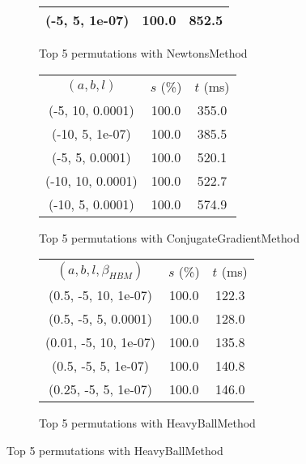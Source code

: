 \begin{figure}[H]
\begin{subfigure}[ht]{.5\textwidth}
\begin{tabular}{|c|c|c|}
(-5, 5, 1e-07) & 100.0 & 852.5 \\
\hline
\end{tabular}
\caption{Top 5 permutations with NewtonsMethod}
\label{subfig:param_comp_GoldenSectionSearch_NewtonsMethod}
\end{subfigure}
\hfill
\begin{subfigure}[ht]{.5\textwidth}
\begin{tabular}{|c|c|c|}
\hline
\rowcolor{gray!25}
\multicolumn{3}{|c|}{ConjugateGradientMethod} \\
\hline
\rowcolor{gray!25}
$(a,b,l)$ & $s$ (\%) & $t$ (ms) \\
\hline
(-5, 10, 0.0001) & 100.0 & 355.0 \\
(-10, 5, 1e-07) & 100.0 & 385.5 \\
(-5, 5, 0.0001) & 100.0 & 520.1 \\
(-10, 10, 0.0001) & 100.0 & 522.7 \\
(-10, 5, 0.0001) & 100.0 & 574.9 \\
\hline
\end{tabular}
\caption{Top 5 permutations with ConjugateGradientMethod}
\label{subfig:param_comp_GoldenSectionSearch_ConjugateGradientMethod}
\end{subfigure}
\hfill
\begin{subfigure}[ht]{.5\textwidth}
\begin{tabular}{|c|c|c|}
\hline
\rowcolor{gray!25}
\multicolumn{3}{|c|}{HeavyBallMethod} \\
\hline
\rowcolor{gray!25}
$(a,b,l,\beta_{HBM})$ & $s$ (\%) & $t$ (ms) \\
\hline
(0.5, -5, 10, 1e-07) & 100.0 & 122.3 \\
(0.5, -5, 5, 0.0001) & 100.0 & 128.0 \\
(0.01, -5, 10, 1e-07) & 100.0 & 135.8 \\
(0.5, -5, 5, 1e-07) & 100.0 & 140.8 \\
(0.25, -5, 5, 1e-07) & 100.0 & 146.0 \\
\hline
\end{tabular}
\caption{Top 5 permutations with HeavyBallMethod}
\label{subfig:param_comp_GoldenSectionSearch_HeavyBallMethod}
\end{subfigure}
\end{figure}